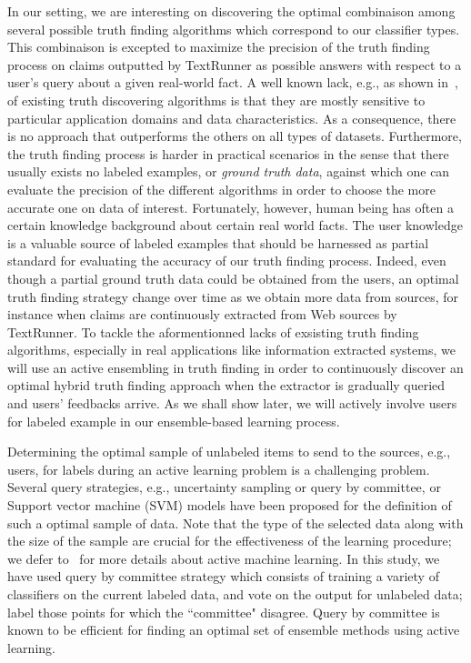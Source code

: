 In our setting, we are interesting on discovering the optimal combinaison among several possible truth finding algorithms
which correspond to our classifier types.
This combinaison is excepted to maximize the precision of the truth finding process on claims outputted by TextRunner as 
possible answers with respect to a user's query about a given real-world fact.
A well known lack, e.g., as shown in~\cite{Li12, Wagui14}, of existing truth discovering algorithms is that they are mostly sensitive
to particular application domains and data characteristics. As a consequence, there is no approach that outperforms the others on all 
types of datasets. Furthermore, the truth finding process is harder in practical scenarios in the sense that there usually exists
no labeled examples, or \emph{ground truth data}, against which one can evaluate the precision of the different algorithms in order to choose
the more accurate one on data of interest.  Fortunately, however, human being has often a certain knowledge background about certain real world facts.
The user knowledge is a valuable source of labeled examples that should be harnessed as partial standard for evaluating the accuracy of our truth finding 
process. Indeed, even though a partial ground truth data could be obtained from the users, an optimal truth finding strategy change over time as we obtain
more data from sources, for instance when claims are continuously extracted from Web sources by TextRunner.
To tackle the aformentionned lacks of exsisting truth finding algorithms, especially in real applications like information extracted systems, 
we will use an active ensembling in truth finding in order to continuously discover an optimal hybrid truth finding approach when the extractor is gradually
queried and users' feedbacks arrive. As we shall show later, we will actively involve users for labeled example in our ensemble-based learning process.

Determining the optimal sample of unlabeled items to send to the sources, e.g., users, for labels during an active learning problem is a challenging problem.
Several query strategies, e.g., uncertainty sampling or query by committee, or Support vector machine (SVM) models have been proposed for the definition of such a optimal sample of data. Note that 
the type of the selected data along with the size of the sample are crucial for the effectiveness of the learning procedure; we defer to~\cite{burr12} for more details about active machine learning. 
In this study, we have used query by committee strategy which consists of training a variety of classifiers on the current labeled data, and vote on the output for unlabeled data; label those 
points for which the ``committee" disagree. Query by committee is known to be efficient for finding an optimal set of ensemble methods using active learning.

